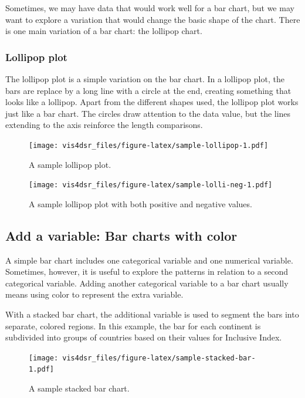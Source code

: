 \documentclass[
]{krantz}
\begin{document}
Sometimes, we may have data that would work well for a bar chart, but we may want to
explore a variation that would change the basic shape of the chart. There is one main
variation of a bar chart: the lollipop chart.

\hypertarget{lollipop-plot}{%
\subsubsection{Lollipop plot}\label{lollipop-plot}}

The lollipop plot is a simple variation on the bar chart. In a lollipop plot,
the bars are replace by a long line with a circle at the end, creating something
that looks like a lollipop. Apart from the different shapes used, the lollipop plot
works just like a bar chart. The circles draw attention to the data value, but the
lines extending to the axis reinforce the length comparisons.

\begin{figure}
\centering
\texttt{[image: vis4dsr\_files/figure-latex/sample-lollipop-1.pdf]}
\caption{\label{fig:sample-lollipop}A sample lollipop plot.}
\end{figure}

\begin{figure}
\centering
\texttt{[image: vis4dsr\_files/figure-latex/sample-lolli-neg-1.pdf]}
\caption{\label{fig:sample-lolli-neg}A sample lollipop plot with both positive and negative values.}
\end{figure}

\hypertarget{add-a-variable-bar-charts-with-color}{%
\subsection{Add a variable: Bar charts with color}\label{add-a-variable-bar-charts-with-color}}

A simple bar chart includes one categorical variable and one numerical variable.
Sometimes, however, it is useful to explore the patterns in relation to a second
categorical variable. Adding another categorical variable to a bar chart usually
means using color to represent the extra variable.

With a stacked bar chart, the additional variable is used to segment the bars into
separate, colored regions. In this example, the bar for each continent is subdivided
into groups of countries based on their values for Inclusive Index.

\begin{figure}
\centering
\texttt{[image: vis4dsr\_files/figure-latex/sample-stacked-bar-1.pdf]}
\caption{\label{fig:sample-stacked-bar}A sample stacked bar chart.}
\end{figure}
\end{document}

